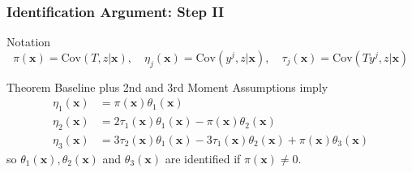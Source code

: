 \documentclass{beamer}
\begin{document}
\begin{frame}
  \frametitle{Identification Argument: Step II}

  \begin{block}{Notation}
    \vspace{-1em}
\[
    \pi(\mathbf{x}) = \mbox{Cov}(T,z|\mathbf{x}), \quad \eta_j(\mathbf{x}) = \mbox{Cov}(y^j,z|\mathbf{x}), \quad \tau_j(\mathbf{x}) = \mbox{Cov}(Ty^j,z|\mathbf{x})
\]
  \end{block}

  \begin{alertblock}{Theorem} 
    Baseline plus 2nd and 3rd Moment Assumptions imply 
\begin{align*}
 \eta_1(\mathbf{x}) &= \pi(\mathbf{x})\theta_1(\mathbf{x})\\
  \eta_2(\mathbf{x}) &=  2\tau_1(\mathbf{x}) \theta_1(\mathbf{x}) - \pi(\mathbf{x})\theta_2(\mathbf{x}) \\
  \eta_3(\mathbf{x}) &=  3\tau_2(\mathbf{x}) \theta_1(\mathbf{x}) - 3\tau_1(\mathbf{x}) \theta_2(\mathbf{x}) + \pi(\mathbf{x})\theta_3(\mathbf{x})
\end{align*}
so $\theta_1(\mathbf{x}), \theta_2(\mathbf{x})$ and $\theta_3(\mathbf{x})$ are identified if $\pi(\mathbf{x})\neq 0$.
  \end{alertblock}



\end{frame}
%
%
%
%
%
\end{document}
